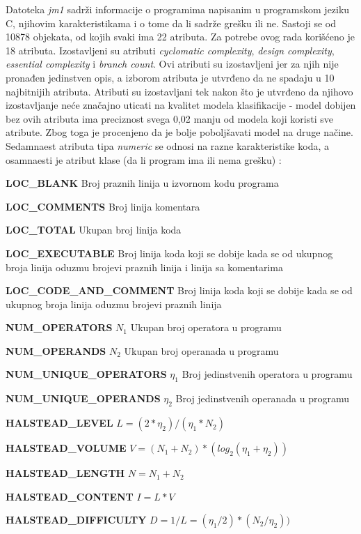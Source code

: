 \documentclass[12pt,oneside]{memoir}
\begin{document}
Datoteka \textit{jm1} sadrži informacije o programima napisanim u programskom jeziku C, njihovim karakteristikama i o tome da li sadrže grešku ili ne. Sastoji se od 10878 objekata, od kojih svaki ima 22 atributa. Za potrebe ovog rada korišćeno je 18 atributa.  Izostavljeni su atributi \textit{cyclomatic complexity}, \textit{design complexity}, \textit{essential complexity} i \textit{branch count}. Ovi atributi su izostavljeni jer za njih nije pronađen jedinstven opis, a izborom atributa je utvrđeno da ne spadaju u 10 najbitnijih atributa. Atributi su izostavljani tek nakon što je utvrđeno da njihovo izostavljanje neće značajno uticati na kvalitet modela klasifikacije - model dobijen bez ovih atributa ima preciznost svega 0,02 manju od modela koji koristi sve atribute. Zbog toga je procenjeno da je bolje poboljšavati model na druge načine. Sedamnaest atributa tipa \textit{numeric} se odnosi na razne karakteristike koda, a osamnaesti je atribut klase (da li program ima ili nema grešku) \cite{jm1, SLOC}: 

\textbf{LOC\_BLANK} Broj praznih linija u izvornom kodu programa

\textbf{LOC\_COMMENTS} Broj linija komentara

\textbf{LOC\_TOTAL} Ukupan broj linija koda

\textbf{LOC\_EXECUTABLE} Broj linija koda koji se dobije kada se od ukupnog broja linija oduzmu brojevi praznih linija i linija sa komentarima

\textbf{LOC\_CODE\_AND\_COMMENT} Broj linija koda koji se dobije kada se od ukupnog broja linija oduzmu brojevi praznih linija

\textbf{NUM\_OPERATORS} $N_1$ Ukupan broj operatora u programu

\textbf{NUM\_OPERANDS} $N_2$ Ukupan broj operanada u programu

\textbf{NUM\_UNIQUE\_OPERATORS} $\eta_1$ Broj jedinstvenih operatora u programu

\textbf{NUM\_UNIQUE\_OPERANDS} $\eta_2$ Broj jedinstvenih operanada u programu

\textbf{HALSTEAD\_LEVEL} $L = (2*\eta_2)/(\eta_1*N_2)$

\textbf{HALSTEAD\_VOLUME} $V = (N_1+N_2)*(log_2(\eta_1+\eta_2))$ %

\textbf{HALSTEAD\_LENGTH} $N = N_1+N_2$

\textbf{HALSTEAD\_CONTENT} $I = L*V$

\textbf{HALSTEAD\_DIFFICULTY} $D = 1/L = (\eta_1/2)*(N_2/\eta_2))$
\end{document}
